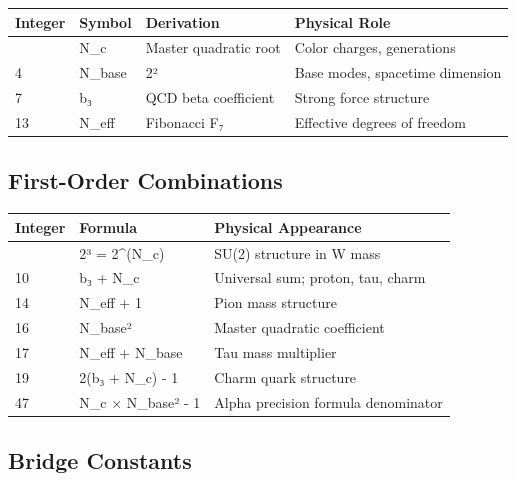 \documentclass[
  11pt,
  letterpaper,
  twoside,
  openany]{book}
\makeatletter
\let\orig@subsection\subsection
\renewcommand{\subsection}{\needspace{6\baselineskip}\orig@subsection}
\makeatother
\begin{document}
\begin{longtable}[]{@{}llll@{}}
\toprule\noalign{}
Integer & Symbol & Derivation & Physical Role \\
\midrule\noalign{}
\endhead
\bottomrule\noalign{}
\endlastfoot
3 & N\_c & Master quadratic root & Color charges, generations \\
4 & N\_base & 2² & Base modes, spacetime dimension \\
7 & b₃ & QCD beta coefficient & Strong force structure \\
13 & N\_eff & Fibonacci F₇ & Effective degrees of freedom \\
\end{longtable}

\subsection{First-Order Combinations}\label{first-order-combinations}

\begin{longtable}[]{@{}lll@{}}
\toprule\noalign{}
Integer & Formula & Physical Appearance \\
\midrule\noalign{}
\endhead
\bottomrule\noalign{}
\endlastfoot
8 & 2³ = 2\^{}(N\_c) & SU(2) structure in W mass \\
10 & b₃ + N\_c & Universal sum; proton, tau, charm \\
14 & N\_eff + 1 & Pion mass structure \\
16 & N\_base² & Master quadratic coefficient \\
17 & N\_eff + N\_base & Tau mass multiplier \\
19 & 2(b₃ + N\_c) - 1 & Charm quark structure \\
47 & N\_c × N\_base² - 1 & Alpha precision formula denominator \\
\end{longtable}

\subsection{Bridge Constants}\label{bridge-constants}
\end{document}
